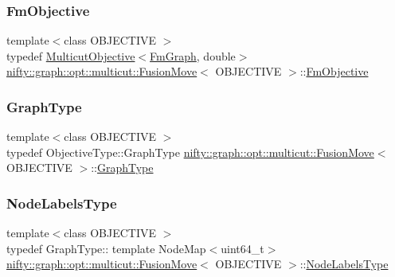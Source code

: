 \subsubsection{\texorpdfstring{Fm\+Objective}{FmObjective}}
{\footnotesize\ttfamily template$<$class O\+B\+J\+E\+C\+T\+I\+VE $>$ \\
typedef \hyperlink{classnifty_1_1graph_1_1opt_1_1multicut_1_1MulticutObjective}{Multicut\+Objective}$<$\hyperlink{classnifty_1_1graph_1_1opt_1_1multicut_1_1FusionMove_ad227dff7da1c30c888980d3ab332fd2c}{Fm\+Graph}, double$>$ \hyperlink{classnifty_1_1graph_1_1opt_1_1multicut_1_1FusionMove}{nifty\+::graph\+::opt\+::multicut\+::\+Fusion\+Move}$<$ O\+B\+J\+E\+C\+T\+I\+VE $>$\+::\hyperlink{classnifty_1_1graph_1_1opt_1_1multicut_1_1FusionMove_a024e1871ed861501626de8e65dfa31a6}{Fm\+Objective}}

\mbox{\label{classnifty_1_1graph_1_1opt_1_1multicut_1_1FusionMove_a5ca6545570a555e7aabf3fc76db45897}} 
\subsubsection{\texorpdfstring{Graph\+Type}{GraphType}}
{\footnotesize\ttfamily template$<$class O\+B\+J\+E\+C\+T\+I\+VE $>$ \\
typedef Objective\+Type\+::\+Graph\+Type \hyperlink{classnifty_1_1graph_1_1opt_1_1multicut_1_1FusionMove}{nifty\+::graph\+::opt\+::multicut\+::\+Fusion\+Move}$<$ O\+B\+J\+E\+C\+T\+I\+VE $>$\+::\hyperlink{classnifty_1_1graph_1_1opt_1_1multicut_1_1FusionMove_a5ca6545570a555e7aabf3fc76db45897}{Graph\+Type}}

\mbox{\label{classnifty_1_1graph_1_1opt_1_1multicut_1_1FusionMove_ab3ca32ed58ba78fca785dc50cd4baedf}} 
\subsubsection{\texorpdfstring{Node\+Labels\+Type}{NodeLabelsType}}
{\footnotesize\ttfamily template$<$class O\+B\+J\+E\+C\+T\+I\+VE $>$ \\
typedef Graph\+Type\+:: template Node\+Map$<$uint64\+\_\+t$>$ \hyperlink{classnifty_1_1graph_1_1opt_1_1multicut_1_1FusionMove}{nifty\+::graph\+::opt\+::multicut\+::\+Fusion\+Move}$<$ O\+B\+J\+E\+C\+T\+I\+VE $>$\+::\hyperlink{classnifty_1_1graph_1_1opt_1_1multicut_1_1FusionMove_ab3ca32ed58ba78fca785dc50cd4baedf}{Node\+Labels\+Type}}

